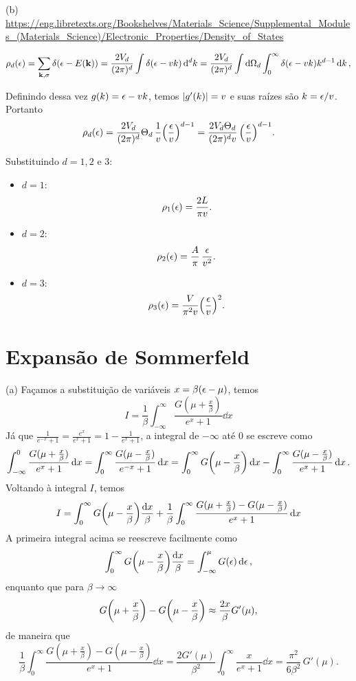 \documentclass[a4paper,10pt]{article}
\begin{document}
(b) \url{https://eng.libretexts.org/Bookshelves/Materials_Science/Supplemental_Modules_(Materials_Science)/Electronic_Properties/Density_of_States}


$$
\rho_d(\epsilon) = \sum_{\vb{k}, \sigma} \delta(\epsilon - E(\vb{k})) =
\frac{2V_d}{(2\pi)^d} \int \delta\qty(\epsilon - vk) \dd[d]{k} =
\frac{2V_d}{(2\pi)^d} \int \dd{\Omega_d} \int_0^\infty \delta\qty(\epsilon - vk) k^{d-1} \dd{k},
$$

Definindo dessa vez $g(k) = \epsilon - vk$, temos $\abs{g'(k)} = v$ e suas raízes são $k = \epsilon/v$. Portanto
$$
\rho_d(\epsilon) = \frac{2V_d}{(2\pi)^d} \Theta_d \, \frac{1}{v}
\qty(\frac{\epsilon}{v})^{d-1} = \frac{2 V_d \Theta_d}{(2\pi)^d v} \, \qty(\frac{\epsilon}{v})^{d-1}.
$$

Substituindo $d = 1, 2$ e $3$:
\begin{itemize}
\item $d = 1$:
$$
\rho_1(\epsilon) = \frac{2 L}{\pi v}.
$$
\item $d = 2$:
$$
\rho_2(\epsilon) = \frac{A}{\pi} \, \frac{\epsilon}{v^2}.
$$
\item $d = 3$:
$$
\rho_3(\epsilon) = \frac{V}{\pi^2 v} \qty(\frac{\epsilon}{v})^2.
$$
\end{itemize}

\pagebreak

\section{Expansão de Sommerfeld}

(a) Façamos a substituição de variáveis $x = \beta(\epsilon - \mu)$, temos
$$
I = \frac{1}{\beta} \int_{-\infty}^{\infty} \frac{G(\mu + \frac{x}{\beta})}{e^{x} + 1} \dd{x}
$$
Já que $\displaystyle{\frac{1}{e^{-x} + 1} = \frac{e^x}{e^x + 1} = 1 - \frac{1}{e^x + 1}}$, a integral de $-\infty$ até $0$ se escreve como
$$
\int_{-\infty}^0 \frac{G(\mu + \frac{x}{\beta})}{e^{x} + 1} \dd{x} =
\int_0^{\infty} \frac{G(\mu - \frac{x}{\beta})}{e^{-x} + 1} \dd{x} =
\int_0^{\infty} G\qty(\mu - \frac{x}{\beta}) \dd{x} -
\int_0^{\infty} \frac{G(\mu - \frac{x}{\beta})}{e^{x} + 1} \dd{x}.
$$
Voltando à integral $I$, temos
$$
I =
\int_0^{\infty} G\qty(\mu - \frac{x}{\beta}) \frac{\dd{x}}{\beta} +
\frac{1}{\beta}
\int_0^{\infty}\frac{G(\mu + \frac{x}{\beta}) - G(\mu - \frac{x}{\beta})}{e^x + 1}\dd{x}
$$
A primeira integral acima se reescreve facilmente como
$$
\int_0^\infty G\qty(\mu - \frac{x}{\beta}) \frac{\dd{x}}{\beta} =
\int_{-\infty}^\mu G(\epsilon) \dd{\epsilon},
$$
enquanto que para $\beta \to \infty$
$$
G\qty(\mu + \frac{x}{\beta}) - G\qty(\mu - \frac{x}{\beta}) \approx \frac{2x}{\beta} G'(\mu),
$$
de maneira que
$$
\frac{1}{\beta}
\int_0^{\infty}\frac{G(\mu + \frac{x}{\beta}) - G(\mu - \frac{x}{\beta})}{e^x + 1}\dd{x}=
\frac{2 G'(\mu)}{\beta^2}
\int_0^{\infty}\frac{x}{e^x + 1}\dd{x} =
\frac{\pi^2}{6 \beta^2} \, G'(\mu).
$$
\end{document}
